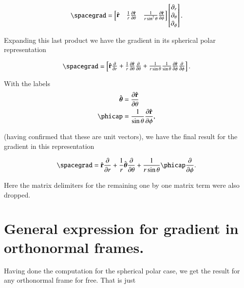 \begin{align}\label{eqn:jacobianSphericalPolar:21}
\spacegrad = 
\begin{bmatrix}
\rcap & \inv{r} \PD{\theta}{\rcap} & \inv{r \sin^2\theta} \PD{\phi}{\rcap} 
\end{bmatrix}
\begin{bmatrix}
\partial_r \\
\partial_\theta \\
\partial_\phi
\end{bmatrix}.
\end{align}

Expanding this last product we have the gradient in its spherical polar representation

\begin{align}\label{eqn:jacobianSphericalPolar:22}
\spacegrad = 
\begin{bmatrix}
\rcap \PD{r}{} + \inv{r} \PD{\theta}{\rcap} \PD{\theta}{} + \inv{r \sin\theta} \inv{\sin\theta} \PD{\phi}{\rcap} \PD{\phi}{}
\end{bmatrix}.
\end{align}

With the labels 
\begin{subequations}
\begin{align}\label{eqn:jacobianSphericalPolar:23}
\thetacap &= \PD{\theta}{\rcap} \\
\phicap &= \inv{\sin\theta} \PD{\phi}{\rcap},
\end{align}
\end{subequations}

(having confirmed that these are unit vectors), we have the final result for the gradient in this representation

\begin{align}\label{eqn:jacobianSphericalPolar:24}
\spacegrad = 
\rcap \PD{r}{} + \inv{r} \thetacap \PD{\theta}{} + \inv{r \sin\theta} \phicap \PD{\phi}{}.
\end{align}

Here the matrix delimiters for the remaining one by one matrix term were also dropped.

\section{General expression for gradient in orthonormal frames.}

Having done the computation for the spherical polar case, we get the result for any orthonormal frame for free.  That is just

